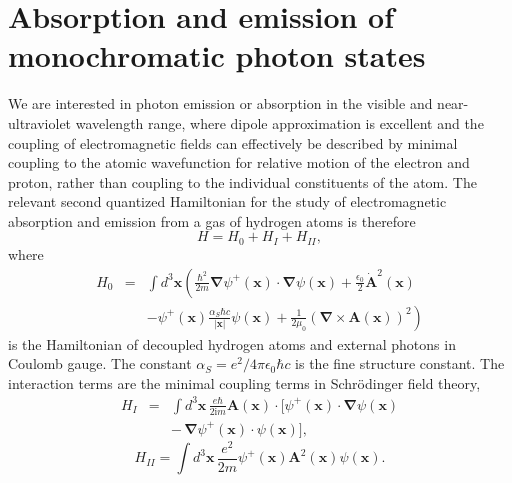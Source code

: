 \documentclass[final,3p,times,twocolumn]{elsarticle3}
\begin{document}
\section{Absorption and emission of monochromatic photon states}
\label{sec:mono}

We are interested in photon emission or absorption in the visible and near-ultraviolet
wavelength range, where dipole approximation is excellent and the coupling of 
electromagnetic fields can effectively be described by minimal coupling to the atomic 
wavefunction for relative motion of the electron and proton, rather than coupling to the 
individual constituents of the atom.
The relevant second quantized Hamiltonian for the study of electromagnetic
absorption and emission from a gas of hydrogen atoms is therefore
\begin{equation}\label{eq:Hegamma}
H=H_0+H_I+H_{II},
\end{equation}
where 
\begin{eqnarray*}
H_0&=&\int\!d^3\bm{x}\left(
\frac{\hbar^2}{2m}\bm{\nabla}\psi^+(\bm{x})\cdot\!\bm{\nabla}\psi(\bm{x})
+\frac{\epsilon_0}{2}\dot{\bm{A}}^2(\bm{x})
\right.
\\
&&
-\left.\psi^+(\bm{x})\frac{\alpha_S\hbar c}{|\bm{x}|}\psi(\bm{x})
+\frac{1}{2\mu_0}\left(\bm{\nabla}\times\bm{A}(\bm{x})\right)^2\right)
\end{eqnarray*}
is the Hamiltonian of decoupled hydrogen atoms and external photons
in Coulomb gauge. The constant $\alpha_S=e^2/4\pi\epsilon_0\hbar c$ is 
the fine structure constant.
The interaction terms are the minimal coupling terms
in Schr\"odinger field theory,
\begin{eqnarray} \nonumber
H_I&=&\int\!d^3\bm{x}\,
\frac{e\hbar}{2\mathrm{i}m}\bm{A}(\bm{x})\cdot
[\psi^+(\bm{x})\cdot\bm{\nabla}\psi(\bm{x})
\\ \label{eq:H1}
&&
-\,\bm{\nabla}\psi^+(\bm{x})\cdot\psi(\bm{x})],
\end{eqnarray}
\begin{equation}\label{eq:H2}
H_{II}=\int\!d^3\bm{x}\,\frac{e^2}{2m}\psi^+(\bm{x})
\bm{A}^2(\bm{x})\psi(\bm{x}).
\end{equation}
\end{document}
